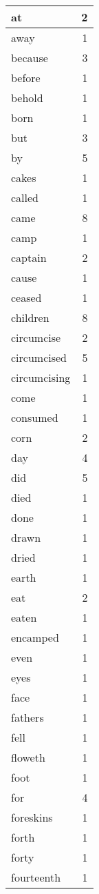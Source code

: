 \begin{center}
\begin{longtable}{l|r}
at & 2 \\ \hline
away & 1 \\ \hline
because & 3 \\ \hline
before & 1 \\ \hline
behold & 1 \\ \hline
born & 1 \\ \hline
but & 3 \\ \hline
by & 5 \\ \hline
cakes & 1 \\ \hline
called & 1 \\ \hline
came & 8 \\ \hline
camp & 1 \\ \hline
captain & 2 \\ \hline
cause & 1 \\ \hline
ceased & 1 \\ \hline
children & 8 \\ \hline
circumcise & 2 \\ \hline
circumcised & 5 \\ \hline
circumcising & 1 \\ \hline
come & 1 \\ \hline
consumed & 1 \\ \hline
corn & 2 \\ \hline
day & 4 \\ \hline
did & 5 \\ \hline
died & 1 \\ \hline
done & 1 \\ \hline
drawn & 1 \\ \hline
dried & 1 \\ \hline
earth & 1 \\ \hline
eat & 2 \\ \hline
eaten & 1 \\ \hline
encamped & 1 \\ \hline
even & 1 \\ \hline
eyes & 1 \\ \hline
face & 1 \\ \hline
fathers & 1 \\ \hline
fell & 1 \\ \hline
floweth & 1 \\ \hline
foot & 1 \\ \hline
for & 4 \\ \hline
foreskins & 1 \\ \hline
forth & 1 \\ \hline
forty & 1 \\ \hline
fourteenth & 1 \\ \hline

\end{longtable}
\end{center}
